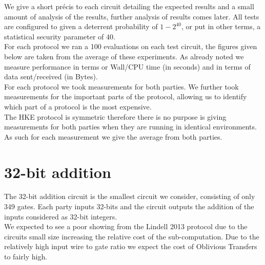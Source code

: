 \documentclass[ %
                    author={Nicholas Tutte},
                supervisor={Prof. Nigel Smart},
                    degree={MEng},
                     title={Secure Two Party Computation},
                  subtitle={A practical comparison of recent protocols},
                      type={Research - GG1K},
                      year={2015} ]{dissertation}
\begin{document}
			We give a short précis to each circuit detailing the expected results and a small amount of analysis of the results, further analysis of results comes later. All tests are configured to given a deterrent probability of $1 - 2^{40}$, or put in other terms, a statistical security parameter of $40$.\\

			For each protocol we ran a 100 evaluations on each test circuit, the figures given below are taken from the average of these experiments. As already noted we measure performance in terms or Wall/CPU time (in seconds) and in terms of data sent/received (in Bytes).\\

			For each protocol we took measurements for both parties. We further took measurements for the important parts of the protocol, allowing us to identify which part of a protocol is the most expensive.\\

			The HKE protocol is symmetric therefore there is no purpose is giving measurements for both parties when they are running in identical environments. As such for each measurement we give the average from both parties.

			\section{32-bit addition}
				The 32-bit addition circuit is the smallest circuit we consider, consisting of only 349 gates. Each party inputs 32-bits and the circuit outputs the addition of the inputs considered as 32-bit integers.\\

				We expected to see a poor showing from the Lindell 2013 protocol due to the circuits small size increasing the relative cost of the sub-computation. Due to the relatively high input wire to gate ratio we expect the cost of Oblivious Transfers to fairly high.

				\renewcommand{\arraystretch}{1.2}
\end{document}
